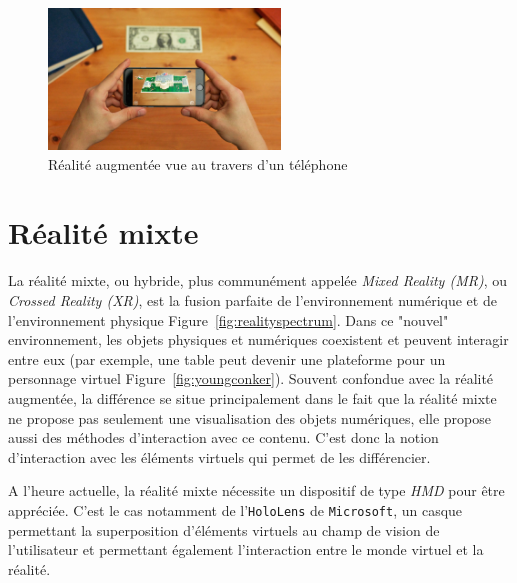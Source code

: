 \begin{figure}[H]
\centering
\includegraphics[width=0.55\textwidth]{images/AR}
\caption{Réalité augmentée vue au travers d'un téléphone\protect\footnotemark}\label{fig:AR}
\end{figure}

\section{Réalité mixte}
\label{sec:MR}
La réalité mixte\cite{ohta2014mixed}, ou hybride, plus communément appelée \emph{Mixed Reality (MR)}, ou \emph{Crossed Reality (XR)}, est la fusion parfaite de l'environnement numérique et de l'environnement physique Figure~\ref{fig:realityspectrum}. Dans ce "nouvel" environnement, les objets physiques et numériques coexistent et peuvent interagir entre eux (par exemple, une table peut devenir une plateforme pour un personnage virtuel Figure~\ref{fig:youngconker}). Souvent confondue avec la réalité augmentée, la différence se situe principalement dans le fait que la réalité mixte ne propose pas seulement une visualisation des objets numériques, elle propose aussi des méthodes d'interaction avec ce contenu. C'est donc la notion d'interaction avec les éléments virtuels qui permet de les différencier. 

A l'heure actuelle, la réalité mixte nécessite un dispositif de type \emph{HMD} pour être appréciée. C'est le cas notamment de l'\texttt{HoloLens} de \texttt{Microsoft}, un casque permettant la superposition d'éléments virtuels au champ de vision de l'utilisateur et permettant également l'interaction entre le monde virtuel et la réalité.

